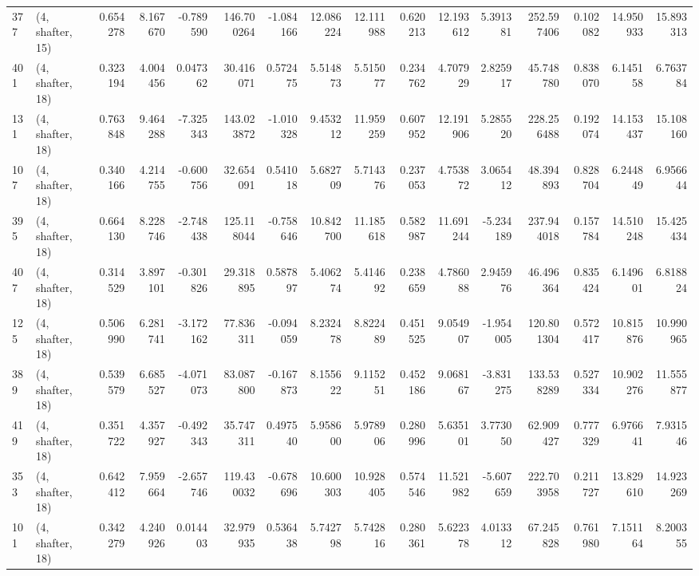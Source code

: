 \begin{tabular}{llrrrrrrrrrrrrrr}
377 &  (4, shafter, 15) &   0.654278 &   8.167670 &  -0.789590 &   146.700264 &  -1.084166 &  12.086224 &  12.111988 &  0.620213 &  12.193612 &   5.391381 &   252.597406 &   0.102082 &  14.950933 &  15.893313 \\
401 &  (4, shafter, 18) &   0.323194 &   4.004456 &   0.047362 &    30.416071 &   0.572475 &   5.514873 &   5.515077 &  0.234762 &   4.707929 &   2.825917 &    45.748780 &   0.838070 &   6.145158 &   6.763784 \\
131 &  (4, shafter, 18) &   0.763848 &   9.464288 &  -7.325343 &   143.023872 &  -1.010328 &   9.453212 &  11.959259 &  0.607952 &  12.191906 &   5.285520 &   228.256488 &   0.192074 &  14.153437 &  15.108160 \\
107 &  (4, shafter, 18) &   0.340166 &   4.214755 &  -0.600756 &    32.654091 &   0.541018 &   5.682709 &   5.714376 &  0.237053 &   4.753872 &   3.065412 &    48.394893 &   0.828704 &   6.244849 &   6.956644 \\
395 &  (4, shafter, 18) &   0.664130 &   8.228746 &  -2.748438 &   125.118044 &  -0.758646 &  10.842700 &  11.185618 &  0.582987 &  11.691244 &  -5.234189 &   237.944018 &   0.157784 &  14.510248 &  15.425434 \\
407 &  (4, shafter, 18) &   0.314529 &   3.897101 &  -0.301826 &    29.318895 &   0.587897 &   5.406274 &   5.414692 &  0.238659 &   4.786088 &   2.945976 &    46.496364 &   0.835424 &   6.149601 &   6.818824 \\
125 &  (4, shafter, 18) &   0.506990 &   6.281741 &  -3.172162 &    77.836311 &  -0.094059 &   8.232478 &   8.822489 &  0.451525 &   9.054907 &  -1.954005 &   120.801304 &   0.572417 &  10.815876 &  10.990965 \\
389 &  (4, shafter, 18) &   0.539579 &   6.685527 &  -4.071073 &    83.087800 &  -0.167873 &   8.155622 &   9.115251 &  0.452186 &   9.068167 &  -3.831275 &   133.538289 &   0.527334 &  10.902276 &  11.555877 \\
419 &  (4, shafter, 18) &   0.351722 &   4.357927 &  -0.492343 &    35.747311 &   0.497540 &   5.958600 &   5.978906 &  0.280996 &   5.635101 &   3.773050 &    62.909427 &   0.777329 &   6.976641 &   7.931546 \\
353 &  (4, shafter, 18) &   0.642412 &   7.959664 &  -2.657746 &   119.430032 &  -0.678696 &  10.600303 &  10.928405 &  0.574546 &  11.521982 &  -5.607659 &   222.703958 &   0.211727 &  13.829610 &  14.923269 \\
101 &  (4, shafter, 18) &   0.342279 &   4.240926 &   0.014403 &    32.979935 &   0.536438 &   5.742798 &   5.742816 &  0.280361 &   5.622378 &   4.013312 &    67.245828 &   0.761980 &   7.151164 &   8.200355 \\

\end{tabular}
